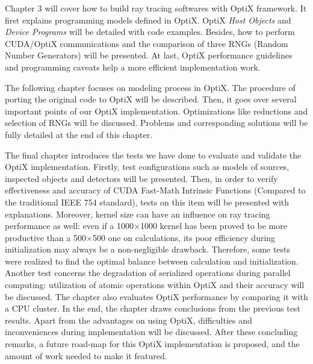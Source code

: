 Chapter 3 will cover how to build ray tracing softwares with OptiX framework. It first explains programming models defined in OptiX. OptiX \textit{Host Objects} and \textit{Device Programs} will be detailed with code examples. Besides, how to perform CUDA/OptiX communications and the comparison of three RNGs (Random Number Generators) will be presented. At last, OptiX performance guidelines and programming caveats help a more efficient implementation work.

The following chapter focuses on modeling process in OptiX. The procedure of porting the original code to OptiX will be described. Then, it goes over several important points of our OptiX implementation. Optimizations like reductions and selection of RNGs will be discussed. Problems and corresponding solutions will be fully detailed at the end of this chapter.

The final chapter introduces the tests we have done to evaluate and validate the OptiX implementation. Firstly, test configurations such as models of sources, inspected objects and detectors will be presented. Then, in order to verify effectiveness and accuracy of CUDA Fast-Math Intrinsic Functions (Compared to the traditional IEEE 754 standard), tests on this item will be presented with explanations. Moreover, kernel size can have an influence on ray tracing performance as well: even if a 1000$\times$1000 kernel has been proved to be more productive than a 500$\times$500 one on calculations, its poor efficiency during initialization may always be a non-negligible drawback. Therefore, some tests were realized to find the optimal balance between calculation and initialization. Another test concerns the degradation of serialized operations during parallel computing: utilization of atomic operations within OptiX and their accuracy will be discussed. The chapter also evaluates OptiX performance by comparing it with a CPU cluster. In the end, the chapter draws conclusions from the previous test results. Apart from the advantages on using OptiX, difficulties and inconveniences during implementation will be discussed. After these concluding remarks, a future road-map for this OptiX implementation is proposed, and the amount of work needed to make it featured.
